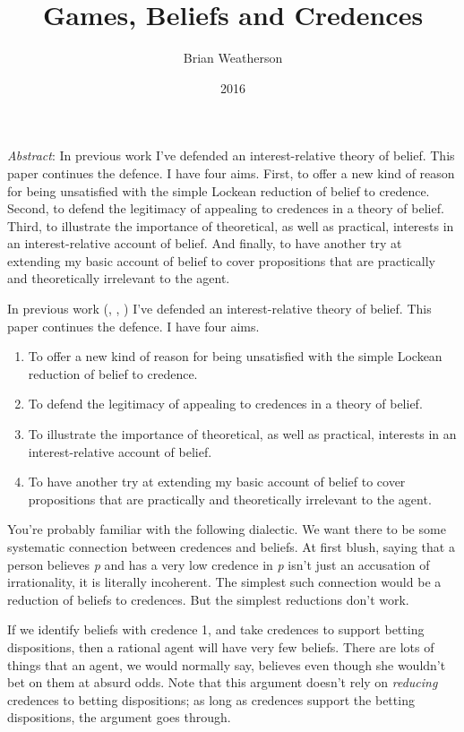 \documentclass[
  11pt,
  letterpaper,
  DIV=11,
  numbers=noendperiod,
  twoside]{scrartcl}
\title{Games, Beliefs and Credences}
\author{Brian Weatherson}
\date{2016}
\providecommand{\tightlist}{%
  \setlength{\itemsep}{0pt}\setlength{\parskip}{0pt}}
\renewenvironment{abstract}
 {\vspace{-1.25cm}
 \quotation\small\noindent\emph{Abstract}:}
 {\endquotation}
\begin{document}
\maketitle
\begin{abstract}
In previous work I've defended an interest-relative theory of belief.
This paper continues the defence. I have four aims. First, to offer a
new kind of reason for being unsatisfied with the simple Lockean
reduction of belief to credence. Second, to defend the legitimacy of
appealing to credences in a theory of belief. Third, to illustrate the
importance of theoretical, as well as practical, interests in an
interest-relative account of belief. And finally, to have another try at
extending my basic account of belief to cover propositions that are
practically and theoretically irrelevant to the agent.
\end{abstract}


In previous work (,
,
) I've defended an
interest-relative theory of belief. This paper continues the defence. I
have four aims.

\begin{enumerate}
\def\labelenumi{\arabic{enumi}.}
\tightlist
\item
  To offer a new kind of reason for being unsatisfied with the simple
  Lockean reduction of belief to credence.
\item
  To defend the legitimacy of appealing to credences in a theory of
  belief.
\item
  To illustrate the importance of theoretical, as well as practical,
  interests in an interest-relative account of belief.
\item
  To have another try at extending my basic account of belief to cover
  propositions that are practically and theoretically irrelevant to the
  agent.
\end{enumerate}

You're probably familiar with the following dialectic. We want there to
be some systematic connection between credences and beliefs. At first
blush, saying that a person believes \emph{p} and has a very low
credence in \emph{p} isn't just an accusation of irrationality, it is
literally incoherent. The simplest such connection would be a reduction
of beliefs to credences. But the simplest reductions don't work.

If we identify beliefs with credence 1, and take credences to support
betting dispositions, then a rational agent will have very few beliefs.
There are lots of things that an agent, we would normally say, believes
even though she wouldn't bet on them at absurd odds. Note that this
argument doesn't rely on \emph{reducing} credences to betting
dispositions; as long as credences support the betting dispositions, the
argument goes through.
\end{document}
